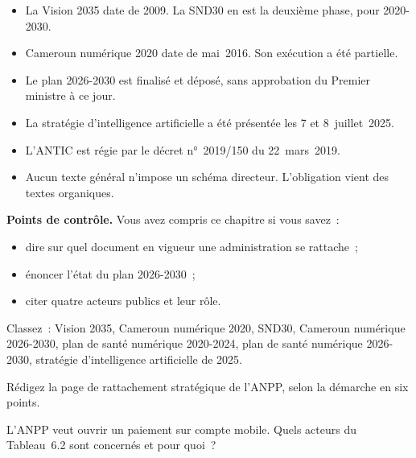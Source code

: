 \begin{boxresume}
\begin{itemize}
    \item La Vision 2035 date de 2009. La SND30 en est la deuxième phase, pour 2020-2030.
    \item Cameroun numérique 2020 date de mai~2016. Son exécution a été partielle.
    \item Le plan 2026-2030 est finalisé et déposé, sans approbation du Premier ministre à ce jour.
    \item La stratégie d'intelligence artificielle a été présentée les 7 et 8~juillet~2025.
    \item L'ANTIC est régie par le décret n°~2019/150 du 22~mars~2019.
    \item Aucun texte général n'impose un schéma directeur. L'obligation vient des textes organiques.
\end{itemize}
\end{boxresume}

\begin{boxinfo}
\textbf{Points de contrôle.} Vous avez compris ce chapitre si vous savez~:
\begin{itemize}
    \item dire sur quel document en vigueur une administration se rattache~;
    \item énoncer l'état du plan 2026-2030~;
    \item citer quatre acteurs publics et leur rôle.
\end{itemize}
\end{boxinfo}

\begin{boxexo}[title={\ding{45}\quad Exercice~6.1. En vigueur, échu, attendu \niveaubase}]
Classez~: Vision 2035, Cameroun numérique 2020, SND30, Cameroun numérique 2026-2030, plan de santé numérique 2020-2024, plan de santé numérique 2026-2030, stratégie d'intelligence artificielle de 2025.
\end{boxexo}

\begin{boxexo}[title={\ding{45}\quad Exercice~6.2. Une page \niveaumoyen}]
Rédigez la page de rattachement stratégique de l'ANPP, selon la démarche en six points.
\end{boxexo}

\begin{boxexo}[title={\ding{45}\quad Exercice~6.3. Qui saisir \niveaumoyen}]
L'ANPP veut ouvrir un paiement sur compte mobile. Quels acteurs du Tableau~6.2 sont concernés et pour quoi~?
\end{boxexo}

